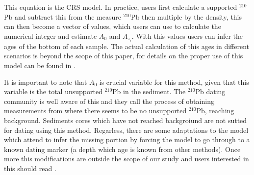\documentclass [10pt] {article}
\newcommand{\ac}{\color{red} }  %
\newcommand{\ca}{\color{black}} %
\begin{document}
This equation is the CRS model. In practice, users first calculate a supported $^{210}$Pb and subtract this from the measure $^{210}$Pb then multiple by the density, this can then become a vector of values, which users can use to calculate the numerical integer and estimate $A_0$ and $A_z_i$. With this values users can infer the ages of the bottom of each sample. The actual calculation of this ages in different scenarios is beyond the scope of this paper, for details on the proper use of this model can be found in \citet{Sanchez-Cabeza2012}.%

It is important to note that $A_0$ is crucial variable for this method, given that this variable is the total unsupported $^{210}$Pb in the sediment. The $^{210}$Pb dating community is well aware of this and they call the process of obtaining measurements from where there seems to be no unsupported $^{210}$Pb, reaching background. Sediments cores which have not reached backgroiund are not sutted for dating using this method. Regarless, there are some adaptations to the model which attend to infer the missing portion by forcing the model to go through to a known dating marker (a depth which age is known from other methods). Once more this modifications are outside the scope of our study and users interested in this should read \citet{Sanchez-Cabeza2012}. 



\end{document}
